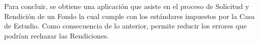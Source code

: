 \begin{resumen}
    
    
    

    
    Para concluir, se obtiene una aplicación que asiste en el proceso de Solicitud y Rendición de un Fondo la cual cumple con los estándares impuestos por la Casa de Estudio. Como consecuencia de lo anterior, permite reducir los errores que podrían rechazar las Rendiciones.




\end{resumen}